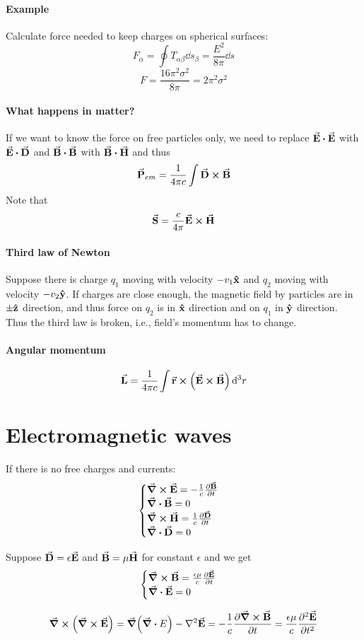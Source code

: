 \paragraph{Example}
Calculate force needed to keep charges on spherical surfaces:
$$F_{\alpha} = \oint T_{\alpha \beta} \dd{s_\beta} = \frac{E^2}{8\pi} \dd{s}$$
$$F = \frac{16 \pi^2 \sigma^2}{8\pi} = 2\pi^2 \sigma^2 $$

\paragraph{What happens in matter?}
If we want to know the force on free particles only, we need to replace $\va{E}\vdot \va{E}$ with $\va{E}\vdot \va{D}$ and $\va{B}\vdot \va{B}$ with $\va{B}\vdot \va{H}$ and thus
$$\va{P}_{em} = \frac{1}{4\pi c} \int \va{D} \cross \va{B}$$
Note that
$$\va{S} = \frac{c}{4\pi} \va{E} \cross \va{H}$$

\paragraph{Third law of Newton}
Suppose there is charge $q_1$ moving with velocity $-v_1\vu{x}$ and $q_2$ moving with velocity $-v_2\vu{y}$. If charges are close enough, the magnetic field by particles are in $\pm \vu{z}$ direction, and thus force on $q_2$ is in $\vu{x}$ direction and on $q_1$ in $\vu{y}$ direction. Thus the third law is broken, i.e., field's momentum has to change.


\paragraph{Angular momentum}
$$\va{L}  = \frac{1}{4\pi c} \int \va{r} \cross \qty(\va{E} \cross \va{B})\dd[3]{r}$$
\section{Electromagnetic waves}
If there is no free charges and currents:
$$\begin{cases}
\curl{\va{E}} = - \frac{1}{c} \pdv{\va{B}}{t}\\
\div{\va{B}}=0\\
\curl{\va{H}} =  \frac{1}{c} \pdv{\va{D}}{t} \\
\div{\va{D}} =0
\end{cases}$$

Suppose $\va{D} = \epsilon \va{E}$ and $\va{B} = \mu \va{H}$ for constant $\epsilon$ and we get
$$\begin{cases}
\curl{\va{B}} =  \frac{\epsilon \mu}{c} \pdv{\va{E}}{t} \\
\div{\va{E}} =0
\end{cases}$$

$$\curl(\curl{\va{E}}) = \grad(\div{E}) - \laplacian{\va{E}} = -\frac{1}{c} \pdv{\curl{\va{B}}}{t} = \frac{\epsilon \mu}{c} \pdv[2]{\va{E}}{t}  $$